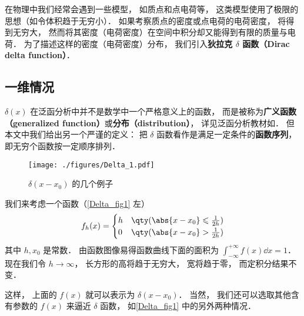 
\begin{issues}
\issueTODO
\end{issues}

在物理中我们经常会遇到一些模型， 如质点和点电荷等， 这类模型使用了极限的思想（如令体积趋于无穷小）． 如果考察质点的密度或点电荷的电荷密度， 将得到无穷大， 然而将其密度（电荷密度）在空间中积分却又能得到有限的质量与电荷． 为了描述这样的密度（电荷密度）分布， 我们引入\textbf{狄拉克 $\delta$ 函数（Dirac delta function）}．

\subsection{一维情况}

$\delta(x)$ 在泛函分析中并不是数学中一个严格意义上的函数， 而是被称为\textbf{广义函数（generalized function）}或\textbf{分布（distribution）}， 详见泛函分析教材如\cite{Zeidler}． 但本文中我们给出另一个严谨的定义： 把 $\delta$ 函数看作是满足一定条件的\textbf{函数序列}， 即无穷个函数按一定顺序排列．

\begin{figure}[ht]
\centering
\texttt{[image: ./figures/Delta\_1.pdf]}
\caption{$\delta(x - x_0)$ 的几个例子} \label{Delta_fig1}
\end{figure}

我们来考虑一个函数（\autoref{Delta_fig1} 左）
\begin{equation}\label{Delta_eq6}
f_h(x) =
\begin{cases}
h & \qty( \abs{x - x_0} \leqslant \frac{1}{2h} )\\
0 & \qty( \abs{x - x_0} > \frac{1}{2h} )
\end{cases}
\end{equation}
其中 $h, x_0$ 是常数． 由函数图像易得函数曲线下面的面积为 $\int_{-\infty}^{+\infty} f(x) \dd{x} = 1$． 现在我们令 $h \to \infty$， 长方形的高将趋于无穷大， 宽将趋于零， 而定积分结果不变．

这样， 上面的 $f(x)$ 就可以表示为 $\delta(x - x_0)$． 当然， 我们还可以选取其他含有参数的 $f(x)$ 来逼近 $\delta$ 函数， 如\autoref{Delta_fig1} 中的另外两种情况．

